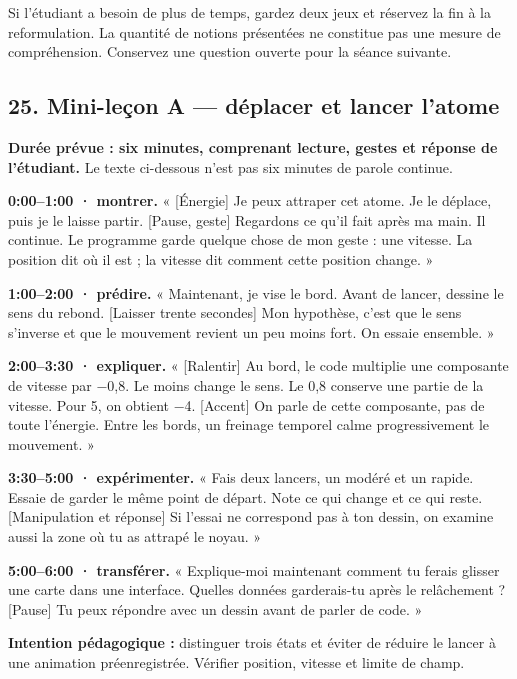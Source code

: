 \documentclass[
  canadien,
  11pt,
  letterpaper,
]{article}
\begin{document}
Si l'étudiant a besoin de plus de temps, gardez deux jeux et réservez la
fin à la reformulation. La quantité de notions présentées ne constitue
pas une mesure de compréhension. Conservez une question ouverte pour la
séance suivante.

\subsection{25. Mini-leçon A --- déplacer et lancer
l'atome}\label{mini-leuxe7on-a-duxe9placer-et-lancer-latome}

\textbf{Durée prévue : six minutes, comprenant lecture, gestes et
réponse de l'étudiant.} Le texte ci-dessous n'est pas six minutes de
parole continue.

\textbf{0:00--1:00 · montrer.} « {[}Énergie{]} Je peux attraper cet
atome. Je le déplace, puis je le laisse partir. {[}Pause, geste{]}
Regardons ce qu'il fait après ma main. Il continue. Le programme garde
quelque chose de mon geste : une vitesse. La position dit où il est ; la
vitesse dit comment cette position change. »

\textbf{1:00--2:00 · prédire.} « Maintenant, je vise le bord. Avant de
lancer, dessine le sens du rebond. {[}Laisser trente secondes{]} Mon
hypothèse, c'est que le sens s'inverse et que le mouvement revient un
peu moins fort. On essaie ensemble. »

\textbf{2:00--3:30 · expliquer.} « {[}Ralentir{]} Au bord, le code
multiplie une composante de vitesse par −0,8. Le moins change le sens.
Le 0,8 conserve une partie de la vitesse. Pour 5, on obtient −4.
{[}Accent{]} On parle de cette composante, pas de toute l'énergie. Entre
les bords, un freinage temporel calme progressivement le mouvement. »

\textbf{3:30--5:00 · expérimenter.} « Fais deux lancers, un modéré et un
rapide. Essaie de garder le même point de départ. Note ce qui change et
ce qui reste. {[}Manipulation et réponse{]} Si l'essai ne correspond pas
à ton dessin, on examine aussi la zone où tu as attrapé le noyau. »

\textbf{5:00--6:00 · transférer.} « Explique-moi maintenant comment tu
ferais glisser une carte dans une interface. Quelles données
garderais-tu après le relâchement ? {[}Pause{]} Tu peux répondre avec un
dessin avant de parler de code. »

\textbf{Intention pédagogique :} distinguer trois états et éviter de
réduire le lancer à une animation préenregistrée. Vérifier position,
vitesse et limite de champ.
\end{document}
